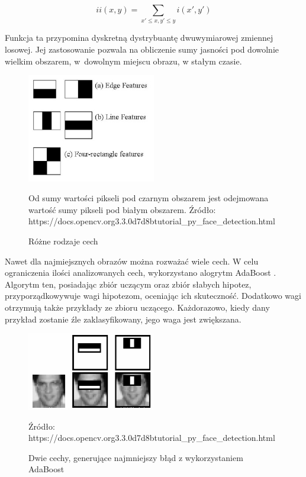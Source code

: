 \documentclass[oneside, eng]{mgr}
\begin{document}
\begin{equation}
	ii(x,y) = \sum_{x' \leq x, y' \leq y} i(x',y')
\end{equation}

Funkcja ta przypomina dyskretną dystrybuantę dwuwymiarowej zmiennej losowej. Jej zastosowanie pozwala na obliczenie sumy jasności pod dowolnie wielkim obszarem, w~dowolnym miejscu obrazu, w stałym czasie.

\begin{figure}
\centering
	\includegraphics[width=0.50\textwidth,natwidth=610,natheight=642]{haar_features.jpg}\par\vspace{0.5cm}
\caption{Różne rodzaje cech}
Od sumy wartości pikseli pod czarnym obszarem jest odejmowana wartość sumy pikseli pod białym obszarem.
Źródło: https://docs.opencv.org\/3.3.0\/d7\/d8b\/tutorial\_py\_face\_detection.html
	\label{fig:features}
\end{figure}

Nawet dla najmiejsznych obrazów można rozważać wiele cech. W celu ograniczenia ilości analizowanych cech, wykorzystano alogrytm AdaBoost \cite{AdaBoost}. Algorytm ten, posiadając zbiór uczącym oraz zbiór słabych hipotez, przyporządkowywuje wagi hipotezom, oceniając ich skuteczność. Dodatkowo wagi otrzymują także przykłady ze zbioru uczącego. Każdorazowo, kiedy dany przykład zostanie źle zaklasyfikowany, jego waga jest zwiększana. 


\begin{figure}
\centering
	\includegraphics[width=0.50\textwidth,natwidth=610,natheight=642]{haar.png}\par\vspace{1cm}
\caption{Dwie cechy, generujące najmniejszy błąd z wykorzystaniem AdaBoost}
Źródło: https://docs.opencv.org\/3.3.0\/d7\/d8b\/tutorial\_py\_face\_detection.html
	\label{fig:best_features}
\end{figure}
\end{document}
